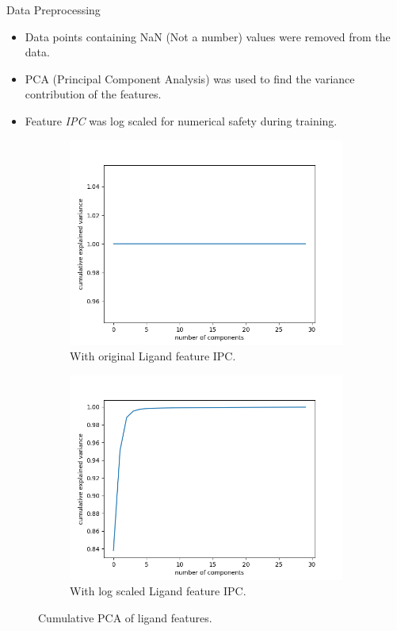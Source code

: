 \documentclass{beamer}
\begin{document}
\begin{frame}[t]{Data Preprocessing}
\begin{itemize}
\item Data points containing NaN (Not a number) values were removed from the data.
\item PCA (Principal Component Analysis) was used to find the variance contribution of the features.
\item Feature \textit{IPC} was log scaled for numerical safety during training.
\end{itemize}

\begin{figure}
     \centering
     \begin{subfigure}[b]{0.4\textwidth}
         \centering
    \includegraphics[scale=0.25]{images/pcaligandanalysisIPC}
    \caption{With original Ligand feature IPC.}
    \label{fig:pcaproteinanalysisIPC}
     \end{subfigure}
     \hfill
     \begin{subfigure}[b]{0.4\textwidth}
         \centering
        \includegraphics[scale=0.25]{images/pcawithscaledIPC}
        \caption{With log scaled Ligand feature IPC.}
        \label{fig:pcawithscaledIPC}
     \end{subfigure}
     \caption{Cumulative PCA of ligand features.}
     \label{fig:PCAAnalysis}
\end{figure}


\end{frame}
\end{document}
